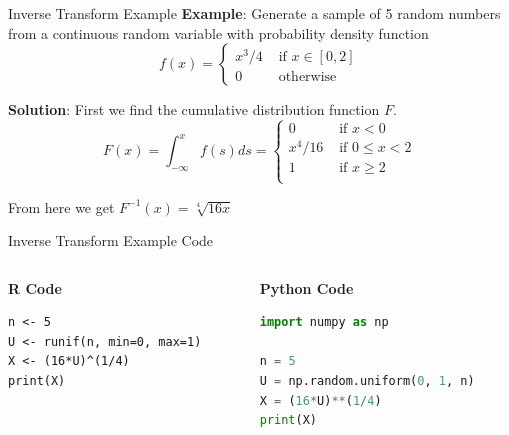 \documentclass[8pt]{beamer}
\begin{document}
\begin{frame}{Inverse Transform Example}
\textbf{Example}: Generate a sample of 5 random numbers from a continuous random variable with probability density function
\begin{equation*}
f(x)=\left\{ 
\begin{array}{ll} 
x^3/4  & \text { if } x \in [0,2]\\
 0 & \text{ otherwise} 
\end{array}
\right.
\end{equation*}

\pause

\textbf{Solution}: First we find the cumulative distribution function $F$.
\begin{equation*}
F(x)=\int_{-\infty}^x f(s)ds=
\left\{ 
\begin{array}{ll}
0 & \text{ if } x<0\\
x^4/16 & \text{ if } 0\leq x<2\\
1  & \text{ if } x \geq 2\\
\end{array}
\right.
\end{equation*}

From here we get $F^{-1}(x)=\sqrt[4]{16x}$
\end{frame}

\begin{frame}[fragile]{Inverse Transform Example}
\alert{Code}

\vspace{2mm}

\begin{columns}[T]
\begin{column}{0.4\textwidth}
\textbf{\textbf{R Code}}
\begin{lstlisting}
n <- 5
U <- runif(n, min=0, max=1)
X <- (16*U)^(1/4)
print(X)
\end{lstlisting}
\end{column}

\begin{column}{0.45\textwidth}
\textbf{Python Code}
\begin{lstlisting}[language=Python]
import numpy as np

n = 5
U = np.random.uniform(0, 1, n)
X = (16*U)**(1/4)
print(X)
\end{lstlisting}
\end{column}
\end{columns}
\end{frame}
\end{document}
